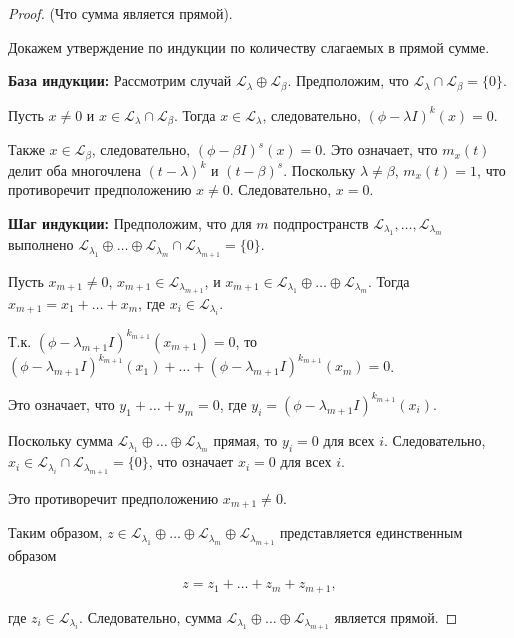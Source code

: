 \vspace{0.4cm}
\begin{proof} (Что сумма является прямой).
\leavevmode \nl 

    Докажем утверждение по индукции по количеству слагаемых в прямой сумме.

    \textbf{База индукции:} Рассмотрим случай $\mathcal{L}_{\lambda} \oplus \mathcal{L}_{\beta}$. Предположим, что $\mathcal{L}_{\lambda} \cap \mathcal{L}_{\beta} = \{0\}$.

    Пусть $x \neq 0$ и $x \in \mathcal{L}_{\lambda} \cap \mathcal{L}_{\beta}$. Тогда $x \in \mathcal{L}_{\lambda}$, следовательно, $(\phi - \lambda I)^k (x) = 0$. 
    
    Также $x \in \mathcal{L}_{\beta}$, следовательно, $(\phi - \beta I)^s (x) = 0$. Это означает, что $m_{x}(t)$ делит оба многочлена $(t - \lambda)^k$ и $(t - \beta)^s$. Поскольку $\lambda \neq \beta$, $m_{x}(t) = 1$, что противоречит предположению $x \neq 0$. Следовательно, $x = 0$.

    \textbf{Шаг индукции:} Предположим, что для $m$ подпространств $\mathcal{L}_{\lambda_{1}}, \ldots, \mathcal{L}_{\lambda_{m}}$ \\выполнено $\mathcal{L}_{\lambda_{1}} \oplus \ldots \oplus \mathcal{L}_{\lambda_{m}} \cap \mathcal{L}_{\lambda_{m+1}} = \{0\}$.

    Пусть $x_{m+1} \neq 0$, $x_{m+1} \in \mathcal{L}_{\lambda_{m+1}}$, и $x_{m+1} \in \mathcal{L}_{\lambda_{1}} \oplus \ldots \oplus \mathcal{L}_{\lambda_{m}}$. Тогда $x_{m+1} = x_{1} + \ldots + x_{m}$, где $x_i \in \mathcal{L}_{\lambda_i}$.

    Т.к. $(\phi - \lambda_{m+1} I)^{k_{m+1}}(x_{m+1}) = 0$, то $(\phi - \lambda_{m+1} I)^{k_{m+1}}(x_{1}) + \ldots + (\phi - \lambda_{m+1} I)^{k_{m+1}}(x_{m}) = 0$. 
    
    Это означает, что $y_{1} + \ldots + y_{m} = 0$, где $y_i = (\phi - \lambda_{m+1} I)^{k_{m+1}}(x_{i})$.

    Поскольку сумма $\mathcal{L}_{\lambda_{1}} \oplus \ldots \oplus \mathcal{L}_{\lambda_{m}}$ прямая, то $y_{i} = 0$ для всех $i$. Следовательно, $x_{i} \in \mathcal{L}_{\lambda_{i}} \cap \mathcal{L}_{\lambda_{m+1}} = \{0\}$, что означает $x_{i} = 0$ для всех $i$. 
    
    Это противоречит предположению $x_{m+1} \neq 0$.

    Таким образом, $z \in \mathcal{L}_{\lambda_{1}} \oplus \ldots \oplus \mathcal{L}_{\lambda_{m}} \oplus \mathcal{L}_{\lambda_{m+1}}$ представляется единственным образом 
    
    $$z = z_{1} + \ldots + z_{m} + z_{m+1},$$
    
    где $z_i \in \mathcal{L}_{\lambda_i}$. Следовательно, сумма $\mathcal{L}_{\lambda_{1}} \oplus \ldots \oplus \mathcal{L}_{\lambda_{m+1}}$ является прямой.
\end{proof}

